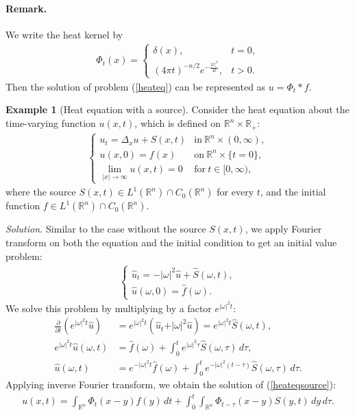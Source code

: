\documentclass{article}
\numberwithin{equation}{section}
\newcommand{\bbR}{\mathbb{R}}
\newcommand{\wh}{\widehat}
\theoremstyle{plain}
\theoremstyle{definition}
\newtheorem{example}[theorem]{Example}
\begin{document}
\paragraph{Remark.} We write the heat kernel by
\begin{align*}
	\Phi_t(x)=\begin{cases}
		\delta(x), &t=0,\\
		(4\pi t)^{-n/2}e^{-\frac{\vert x\vert^2}{4t}}, &t>0.
	\end{cases}
\end{align*}
Then the solution of problem (\ref{heateq}) can be represented as $u=\Phi_t*f$.

\begin{example}[Heat equation with a source]
	Consider the heat equation about the time-varying function $u(x,t)$, which is defined on $\bbR^n\times\bbR_+$:
	\begin{align}
		\begin{cases}
			u_t=\Delta_x u+S(x,t) & \mathrm{in}\ \bbR^n\times(0,\infty),\\
			u(x,0)=f(x)& \mathrm{on}\ \bbR^n\times\{t=0\},\\
			\lim_{\vert x\vert\to\infty}u(x,t)=0 &\mathrm{for}\ t\in[0,\infty),
		\end{cases}\label{heateqsource}
	\end{align}
	where the source $S(x,t)\in L^1(\bbR^n)\cap C_0(\bbR^n)$ for every $t$, and the initial function $f\in L^1(\bbR^n)\cap C_0(\bbR^n)$.
\end{example}

\textit{\hspace{-1.5em}Solution.} Similar to the case without the source $S(x,t)$, we apply Fourier transform on both the equation and the initial condition to get an initial value problem:
\begin{align*}
\begin{cases}
	\wh{u}_t=-\vert\omega\vert^2\wh{u}+\wh{S}(\omega,t),\\
	\wh{u}(\omega,0)=\wh{f}(\omega).
\end{cases}
\end{align*}
We solve this problem by multiplying by a factor $e^{\vert\omega\vert^2 t}$:
\begin{align*}
	\frac{\partial}{\partial t}\left(e^{\vert\omega\vert^2 t}\wh{u}\right)&=e^{\vert\omega\vert^2 t}\left(\wh{u}_t+\vert\omega\vert^2\wh{u}\right)=e^{\vert\omega\vert^2 t}\wh{S}(\omega,t),\\
	e^{\vert\omega\vert^2 t}\wh{u}(\omega,t)&=\wh{f}(\omega)+\int_0^te^{\vert\omega\vert^2 \tau}\wh{S}(\omega,\tau)\,d\tau,\\
	\wh{u}(\omega,t)&=e^{-\vert\omega\vert^2 t}\wh{f}(\omega)+\int_0^te^{-\vert\omega\vert^2 (t-\tau)}\wh{S}(\omega,\tau)\,d\tau.
\end{align*}
Applying inverse Fourier transform, we obtain the solution of (\ref{heateqsource}):
\begin{align*}
	u(x,t)=\int_{\bbR^n}\Phi_t(x-y)f(y)\,dt+\int_0^t\int_{\bbR^n}\Phi_{t-\tau}(x-y)S(y,t)\,dy\,d\tau.\tag*{\qed}
\end{align*}
\end{document}
